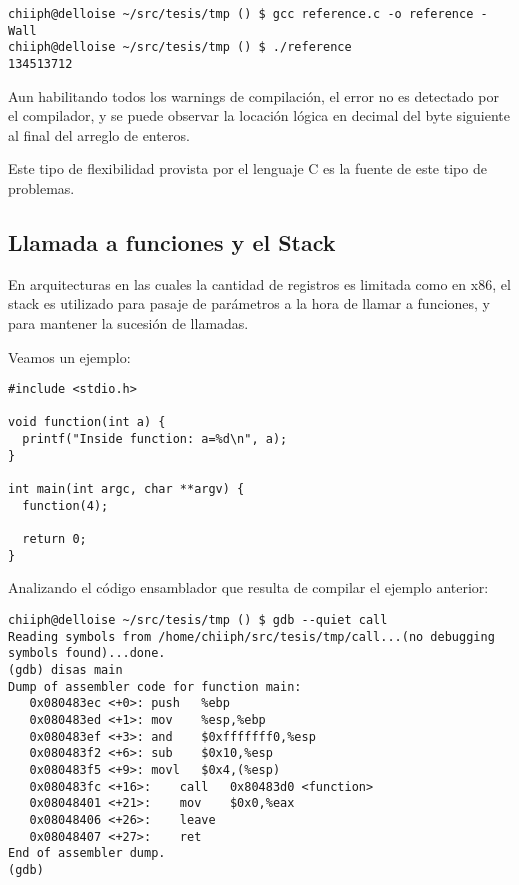 	\vspace{5 mm}
	
\begin{lstlisting}
chiiph@delloise ~/src/tesis/tmp () $ gcc reference.c -o reference -Wall
chiiph@delloise ~/src/tesis/tmp () $ ./reference 
134513712
\end{lstlisting}

	\vspace{5 mm}
	
Aun habilitando todos los warnings de compilaci\'on, el error no es detectado por el compilador, y se puede observar la locaci\'on l\'ogica en decimal del byte siguiente al final del arreglo de enteros.

Este tipo de flexibilidad provista por el lenguaje C es la fuente de este tipo de problemas.

\subsection{Llamada a funciones y el Stack}
	\label{sec:llamada_funciones}

En arquitecturas en las cuales la cantidad de registros es limitada como en x86, el stack es utilizado para pasaje de par\'ametros a la hora de llamar a funciones, y para mantener la sucesi\'on de llamadas.

Veamos un ejemplo:

	\vspace{5 mm}
	
\begin{lstlisting}
#include <stdio.h>

void function(int a) {
  printf("Inside function: a=%d\n", a);
}

int main(int argc, char **argv) {
  function(4);

  return 0;
}
\end{lstlisting}

	\vspace{5 mm}
	
Analizando el c\'odigo ensamblador que resulta de compilar el ejemplo anterior:

	\vspace{5 mm}
	
\begin{lstlisting}
chiiph@delloise ~/src/tesis/tmp () $ gdb --quiet call
Reading symbols from /home/chiiph/src/tesis/tmp/call...(no debugging symbols found)...done.
(gdb) disas main
Dump of assembler code for function main:
   0x080483ec <+0>:	push   %ebp
   0x080483ed <+1>:	mov    %esp,%ebp
   0x080483ef <+3>:	and    $0xfffffff0,%esp
   0x080483f2 <+6>:	sub    $0x10,%esp
   0x080483f5 <+9>:	movl   $0x4,(%esp)
   0x080483fc <+16>:	call   0x80483d0 <function>
   0x08048401 <+21>:	mov    $0x0,%eax
   0x08048406 <+26>:	leave  
   0x08048407 <+27>:	ret    
End of assembler dump.
(gdb)
\end{lstlisting}

